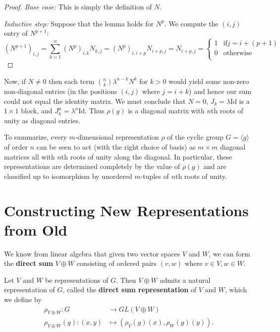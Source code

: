 \begin{example}
\begin{lemma}
\begin{proof}
 {\textit{Base case:}} This is simply the definition of $N$.

 \textit{Inductive step:} Suppose that the lemma holds for $N^p$.  We compute the $(i,j)$ entry of $N^{p+1}$:
\[ (N^{p+1})_{i,j} = \sum_{k=1}^{n} (N^{p})_{i,k} N_{k, j} = (N^p)_{i, i +p} N_{i +p, j} = N_{i +p, j} =\begin{cases} 
      1 & \text{if}  j = i + (p +1) \\
      0 & \text{otherwise} \\
   \end{cases}  \]

\end{proof}
\end{lemma}

Now, if $N \neq 0$ then each term $\binom {n}{k} \lambda ^ {n - k } N ^k$ for $k > 0$ would yield some non-zero non-diagonal entries (in the positions $(i,j)$ where $j= i + k$) and hence our sum could not equal the identity matrix.  We must conclude that $N = 0$, $J_k = \lambda \text{Id}$ is a $1 \times 1$ block, and $J_k ^n = \lambda ^ n \text{Id}$.  Thus $\rho(g)$ is a diagonal matrix with $n$th roots of unity as diagonal entries. 

To summarize, every $m$-dimensional representation $\rho$ of the cyclic group $G = \langle g \rangle$ of order $n$ can be seen to act (with the right choice of basis) as $m \times m$ diagonal matrices all with $n$th roots of unity along the diagonal.  In particular, these representations are determined completely by the value of $\rho(g)$ and are classified up to isomorphism by unordered $m$-tuples of $n$th roots of unity.
\end{example}

\section{Constructing New Representations from Old}
We know from linear algebra that given two vector spaces $V$ and $W$, we can form the \textbf{direct sum} $V \oplus W$ consisting of ordered pairs $(v ,w)$ where $v \in V, w \in W$.  

\begin{defn}
Let $V$ and $W$ be representations of $G$.  Then $V \oplus W$ admits a  natural representation of $G$, called the \textbf{direct sum representation} of $V$ and $W$, which we define by 
\begin{align*}
\rho_{V \oplus W} \colon G &\to GL(V \oplus W) \\
\rho_{V \oplus W}(g) \colon (x,y) &\mapsto (\rho_{V} (g)(x), \rho_{W}(g)(y)).
\end{align*}
\end{defn}


